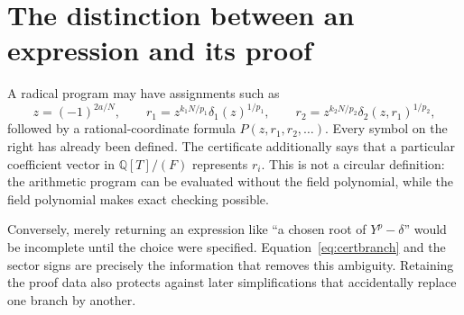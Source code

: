 \documentclass[11pt,letterpaper]{article}
\theoremstyle{definition}\newtheorem{definition}[theorem]{Definition}
\theoremstyle{remark}\newtheorem{remark}[theorem]{Remark}
\newcommand{\Q}{\mathbb Q}\newcommand{\C}{\mathbb C}\newcommand{\Z}{\mathbb Z}
\begin{document}
\section{The distinction between an expression and its proof}
A radical program may have assignments such as
\[
 z=(-1)^{2a/N},\qquad r_1=z^{k_1N/p_1}\delta_1(z)^{1/p_1},\qquad
 r_2=z^{k_2N/p_2}\delta_2(z,r_1)^{1/p_2},
\]
followed by a rational-coordinate formula $P(z,r_1,r_2,\ldots)$. Every symbol on the right has already been defined. The certificate additionally says that a particular coefficient vector in $\Q[T]/(F)$ represents $r_i$. This is not a circular definition: the arithmetic program can be evaluated without the field polynomial, while the field polynomial makes exact checking possible.

Conversely, merely returning an expression like ``a chosen root of $Y^p-\delta$'' would be incomplete until the choice were specified. Equation~\eqref{eq:certbranch} and the sector signs are precisely the information that removes this ambiguity. Retaining the proof data also protects against later simplifications that accidentally replace one branch by another.
\end{document}
